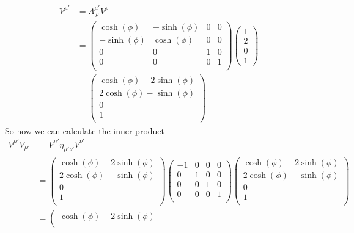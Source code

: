 \documentclass[11pt]{article}
\numberwithin{equation}{section}
\begin{document}
\begin{enumerate}[(a)]
\begin{align*}
V^{\mu'} &= \Lambda^{\mu'}_{\ \rho}V^{\rho}\\
&= \left(\begin{array}{cccc}
	\cosh(\phi) &-\sinh(\phi) &0 &0\\
	-\sinh(\phi) &\cosh(\phi) &0 &0\\
	0 &0 &1 &0\\
	0 &0 &0 &1\\
\end{array}\right)
\left(\begin{array}{c}
			1\\ 2\\ 0\\ 1
			\end{array}\right)\\
&= \left(\begin{array}{c}
		\cosh(\phi)-2\sinh(\phi)\\
		2\cosh(\phi) - \sinh(\phi)\\
		0\\
		1\\
			\end{array}\right)
\end{align*}
So now we can calculate the inner product
\begin{align*}
V^{\mu'}V_{\mu'} &= V^{\mu'}\eta_{\mu'\nu'}V^{\nu'}\\ 
		&= \left(\begin{array}{c}
		\cosh(\phi)-2\sinh(\phi)\\
		2\cosh(\phi) - \sinh(\phi)\\
		0\\
		1\\
			\end{array}\right)
		\left(\begin{array}{cccc}
			-1 &0 &0 &0\\
			0 &1 &0 &0\\
			0 &0 &1 &0\\
			0 &0 &0 &1\\
		\end{array}\right)
		\left(\begin{array}{c}
		\cosh(\phi)-2\sinh(\phi)\\
		2\cosh(\phi) - \sinh(\phi)\\
		0\\
		1\\
			\end{array}\right)\\
		&= \left(\begin{array}{c}
		\cosh(\phi)-2\sinh(\phi)\\

\end{array}
\end{align*}
\end{enumerate}
\end{document}
